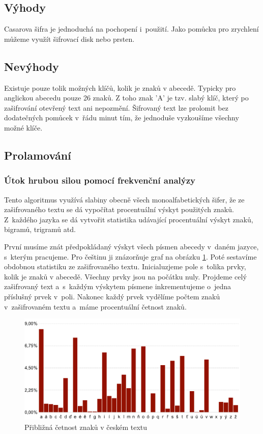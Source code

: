 \documentclass[glossaries, index]{kidiplom}
\begin{document}
\subsection{Výhody}
Casarova šifra je jednoduchá na pochopení i~použití. Jako pomůcku pro zrychlení můžeme využít šifrovací disk nebo prsten.

\subsection{Nevýhody}
Existuje pouze tolik možných klíčů, kolik je znaků v abecedě. Typicky pro anglickou abecedu pouze 26 znaků. Z toho znak 'A' je tzv. slabý klíč, který po zašifrování otevřený text ani nepozmění. Šifrovaný text lze prolomit bez dodatečných pomůcek v~řádu minut tím, že jednoduše vyzkoušíme všechny možné klíče.

\subsection{Prolamování}
\subsubsection{Útok hrubou silou pomocí frekvenční analýzy}
\label{caesar-frekvencni-analyza}
Tento algoritmus využívá slabiny obecně všech monoalfabetických šifer, že ze zašifrovaného textu se dá vypočítat procentuální výskyt použitých znaků. Z~každého jazyka se dá vytvořit statistika udávající procentuální výskyt znaků, bigramů, trigramů atd.

První musíme znát předpokládaný výskyt všech písmen abecedy v~daném jazyce, s~kterým pracujeme. Pro češtinu ji znázorňuje graf na obrázku \ref{czech-frequency-analysis}. Poté sestavíme obdobnou statistiku ze zašifrovaného textu. Inicialuzjeme pole s~tolika prvky, kolik je znaků v abecedě. Všechny prvky jsou na počátku nuly. Projdeme celý zašifrovaný text a~s~každým výskytem písmene inkrementujeme o~jedna příslušný prvek v~poli. Nakonec každý prvek vydělíme počtem znaků v~zašifrovaném textu a~máme procentuální četnost znaků. 
 
\begin{figure}[htbp]
\centering
\includegraphics[scale=0.42]{graphics/czech_frequency.png}
\caption{Přibližná četnost znaků v českém textu \cite{letterfrequencywiki}}
\label{czech-frequency-analysis}
\end{figure}
\end{document}
